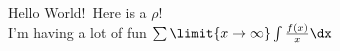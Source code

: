 \documentclass{beamer}
\begin{document}
	Hello World!\
	Here is a \(\rho\)!
	\\
	I'm having a lot of fun \( \sum \limit{x \to \infty} \int \frac{f(x)}{x}\dx \)
\end{document}
